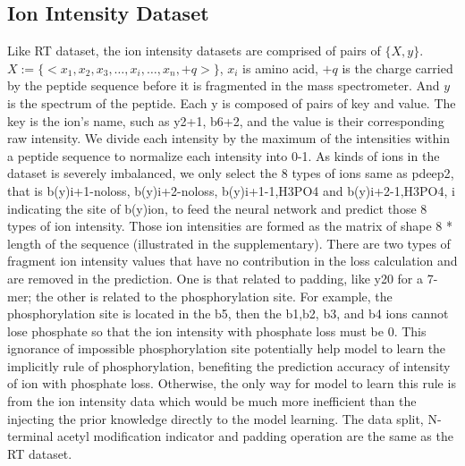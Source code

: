 \subsection{Ion Intensity Dataset}
Like RT dataset, the ion intensity datasets are comprised of pairs of 
\( \{X, y\} \). $X := \{ <x_1, x_2, x_3,\dots, x_i, \dots, x_n, +q> \}$, $x_i$ is amino acid, $+q$ 
is the charge carried by the
peptide sequence before it is fragmented in the mass spectrometer. And \( y \) is the spectrum of the peptide. Each y is composed of pairs of key and value.
The key is the ion's name, such as y2+1, b6+2, and the value is their corresponding raw intensity.
We divide each intensity by the maximum of the intensities within a peptide sequence to normalize each intensity into 0-1. As kinds of ions in the dataset is severely imbalanced, we only select the 8 types of ions same as pdeep2\cite{zeng2019ms}, that is 
b(y)i+1-noloss, b(y)i+2-noloss, b(y)i+1-1,H3PO4 and b(y)i+2-1,H3PO4, i indicating the site of b(y)ion, 
to feed the neural network and predict those 8 types of ion intensity. Those ion intensities are formed as the matrix of shape 8 * length of the sequence (illustrated in the supplementary). 
There are two types of fragment ion intensity values that have no contribution in the loss calculation and are removed in the prediction. One is that related to padding, like y20 for a 7-mer; the other is related to the phosphorylation site. For example, the phosphorylation site is located in the b5, then the b1,b2, b3, and b4 ions cannot lose phosphate so that the ion intensity with phosphate loss must be 0. This ignorance of impossible phosphorylation site potentially help model to learn the implicitly rule of phosphorylation, benefiting the prediction accuracy of intensity of ion with phosphate loss. Otherwise, the only way for model to learn this rule is from the ion intensity data which would be much more inefficient than the injecting the prior knowledge directly to the model learning. 
The data split, N-terminal acetyl modification indicator and padding operation are the same as the RT dataset.